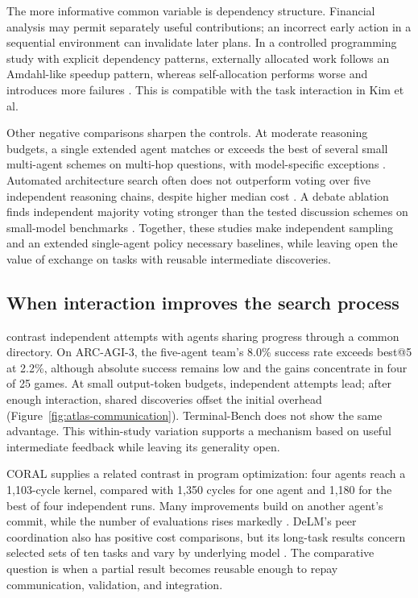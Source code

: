 The more informative common variable is dependency structure. Financial analysis may permit separately useful contributions; an incorrect early action in a sequential environment can invalidate later plans. In a controlled programming study with explicit dependency patterns, externally allocated work follows an Amdahl-like speedup pattern, whereas self-allocation performs worse and introduces more failures \citep{lm-teams-distributed-systems}. This is compatible with the task interaction in Kim et al.

Other negative comparisons sharpen the controls. At moderate reasoning budgets, a single extended agent matches or exceeds the best of several small multi-agent schemes on multi-hop questions, with model-specific exceptions \citep{tran-kiela-equal-budget}. Automated architecture search often does not outperform voting over five independent reasoning chains, despite higher median cost \citep{illusion-multi-agent-advantage}. A debate ablation finds independent majority voting stronger than the tested discussion schemes on small-model benchmarks \citep{debate-or-vote}. Together, these studies make independent sampling and an extended single-agent policy necessary baselines, while leaving open the value of exchange on tasks with reusable intermediate discoveries.

\subsection{When interaction improves the search process}
\citet{test-time-communication} contrast independent attempts with agents sharing progress through a common directory. On ARC-AGI-3, the five-agent team's 8.0\% success rate exceeds best@5 at 2.2\%, although absolute success remains low and the gains concentrate in four of 25 games. At small output-token budgets, independent attempts lead; after enough interaction, shared discoveries offset the initial overhead (Figure~\ref{fig:atlas-communication}). Terminal-Bench does not show the same advantage. This within-study variation supports a mechanism based on useful intermediate feedback while leaving its generality open.

CORAL supplies a related contrast in program optimization: four agents reach a 1,103-cycle kernel, compared with 1,350 cycles for one agent and 1,180 for the best of four independent runs. Many improvements build on another agent's commit, while the number of evaluations rises markedly \citep{coral}. DeLM's peer coordination also has positive cost comparisons, but its long-task results concern selected sets of ten tasks and vary by underlying model \citep{delm-shared-context}. The comparative question is when a partial result becomes reusable enough to repay communication, validation, and integration.


